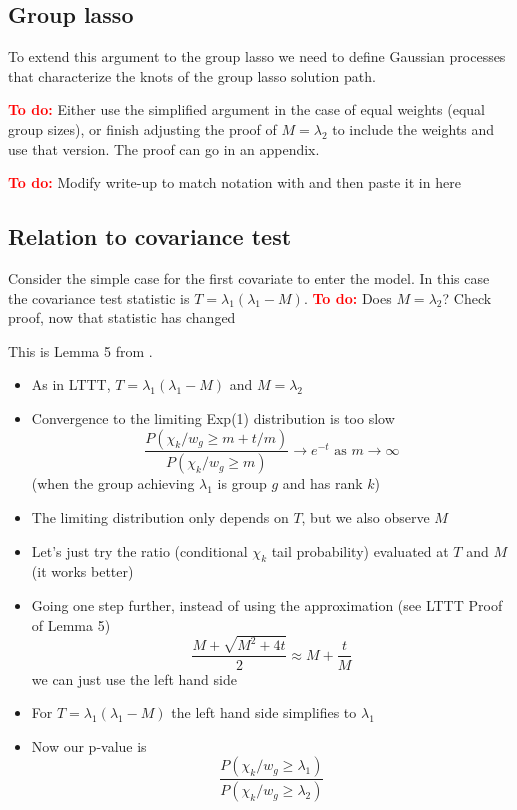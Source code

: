 \documentclass{imsart}
\newcommand{\todo}{\textcolor{red}{\textbf{To do: }}}
\begin{document}
\subsection{Group lasso}
To extend this argument to the group lasso we need to define Gaussian
processes that characterize the knots of the group lasso solution
path.  

\todo Either use the simplified argument in the case of equal weights
(equal group sizes), or finish adjusting the proof of $M = \lambda_2$
to include the weights and use that version. The proof can go in an
appendix. 

\todo Modify write-up to match notation with \cite{tests:adaptive} and
then paste it in here

\subsection{Relation to covariance test}

Consider the simple case for the first covariate to enter the model.
In this case the covariance test statistic is $T = \lambda_1(\lambda_1 - M)$.
\todo Does $M = \lambda_2$? Check proof, now that statistic has changed

This is Lemma 5 from \cite{significance:lasso}.

\begin{itemize}

  \item As in LTTT, $T = \lambda_1 (\lambda_1 - M)$ and $M = \lambda_2$
  \item Convergence to the limiting Exp(1) distribution is too slow
    \[
      \frac{P(\chi_k / w_g \geq m + t/m)}{P(\chi_k / w_g \geq m)} \to e^{-t} \text{ as } m \to \infty
    \]
    (when the group achieving $\lambda_1$ is group $g$ and has rank $k$)
  \item The limiting distribution only depends on $T$, but we also observe $M$
  \item Let's just try the ratio (conditional $\chi_k$ tail probability) evaluated at $T$ and $M$ (it works better)
  \item Going one step further, instead of using the approximation (see LTTT Proof of Lemma 5)
    \[
      \frac{M + \sqrt{M^2+4t}}{2} \approx M + \frac{t}{M}
    \]
    we can just use the left hand side
  \item For $T = \lambda_1(\lambda_1 - M)$ the left hand side simplifies to $\lambda_1$
  \item Now our p-value is
    \[
      \frac{P(\chi_k / w_g \geq \lambda_1)}{P(\chi_k / w_g \geq \lambda_2)}
    \]   
\end{itemize}
\end{document}
